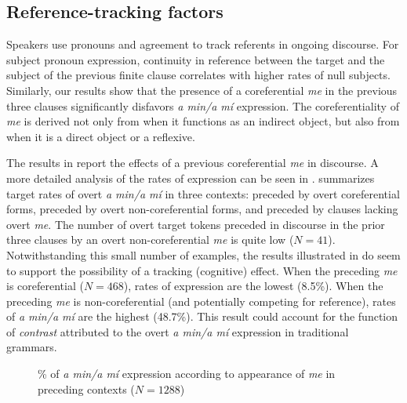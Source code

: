 \documentclass[output=paper]{langscibook}
\begin{document}
\subsection{Reference-tracking factors} Speakers use pronouns and agreement to track referents in ongoing discourse. For subject pronoun expression, continuity in reference between the target and the subject of the previous finite clause correlates with higher rates of null subjects. Similarly, our results show that the presence of a coreferential \textit{me} in the previous three clauses significantly disfavors \textit{a min\slash a mí} expression. The coreferentiality of \textit{me} is derived not only from when it functions as an indirect object, but also from when it is a direct object or a reflexive. 

The results in  report the effects of a previous coreferential \textit{me} in discourse. A more detailed analysis of the rates of expression can be seen in .  summarizes target rates of overt \textit{a min\slash a mí} in three contexts: preceded by overt coreferential forms, preceded by overt non-coreferential forms, and preceded by clauses lacking overt \textit{me}. The number of overt target tokens preceded in discourse in the prior three clauses by an overt non-coreferential \textit{me} is quite low ($N = 41$). Notwithstanding this small number of examples, the results illustrated in  do seem to support the possibility of a tracking (cognitive) effect. When the preceding \textit{me} is coreferential ($N = 468$), rates of expression are the lowest (8.5\%). When the preceding \textit{me} is non-coreferential (and potentially competing for reference), rates of \textit{a min\slash a mí} are the highest (48.7\%). This result could account for the function of \textit{contrast} attributed to the overt \textit{a min\slash a mí} expression in traditional grammars. 

  
\begin{figure}[ht]
\caption{\% of \textit{a min\slash a mí} expression according to appearance of \textit{me} in preceding contexts ($N =1288$)\label{fig:brown:1}}
\end{figure}
\end{document}
